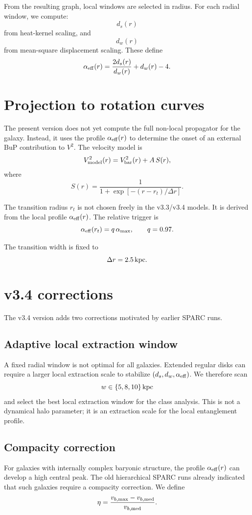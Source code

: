 \documentclass[11pt,a4paper]{article}
\begin{document}
From the resulting graph, local windows are selected in radius. For each radial
window, we compute:
\[
d_s(r)
\]
from heat-kernel scaling, and
\[
d_w(r)
\]
from mean-square displacement scaling. These define
\[
\alpha_{\rm eff}(r)
=
\frac{2d_s(r)}{d_w(r)}
+
d_w(r)
-
4.
\]

\section{Projection to rotation curves}

The present version does not yet compute the full non-local propagator for the
galaxy. Instead, it uses the profile \(\alpha_{\rm eff}(r)\) to determine the
onset of an external BuP contribution to \(V^2\). The velocity model is
\[
V^2_{\rm model}(r)
=
V^2_{\rm bar}(r)
+
A\,S(r),
\]
where
\[
S(r)
=
\frac{1}{1+\exp[-(r-r_t)/\Delta r]}.
\]

The transition radius \(r_t\) is not chosen freely in the v3.3/v3.4 models. It
is derived from the local profile \(\alpha_{\rm eff}(r)\). The relative trigger
is
\[
\alpha_{\rm eff}(r_t)
=
q\,\alpha_{\max},
\qquad
q=0.97.
\]

The transition width is fixed to
\[
\Delta r=2.5\,{\rm kpc}.
\]

\section{v3.4 corrections}

The v3.4 version adds two corrections motivated by earlier SPARC runs.

\subsection{Adaptive local extraction window}

A fixed radial window is not optimal for all galaxies. Extended regular disks
can require a larger local extraction scale to stabilize
\((d_s,d_w,\alpha_{\rm eff})\). We therefore scan
\[
w\in\{5,8,10\}\,{\rm kpc}
\]
and select the best local extraction window for the class analysis. This is not
a dynamical halo parameter; it is an extraction scale for the local entanglement
profile.

\subsection{Compacity correction}

For galaxies with internally complex baryonic structure, the profile
\(\alpha_{\rm eff}(r)\) can develop a high central peak. The old hierarchical
SPARC runs already indicated that such galaxies require a compacity correction.
We define
\[
\eta
=
\frac{v_{b,\max}-v_{b,\rm med}}{v_{b,\rm med}}.
\]
\end{document}
